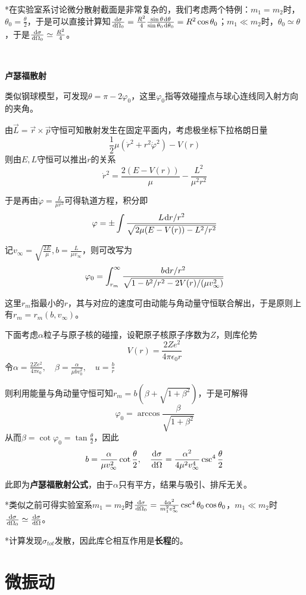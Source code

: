 \documentclass[a4paper,UTF8,fontset=windows]{ctexart}
\newcommand*{\dr}{\hspace{0.07em}\mathrm{d}}
\begin{document}
*在实验室系讨论微分散射截面是非常复杂的，我们考虑两个特例：$m_1=m_2$时，$\theta_0=\frac{\theta}{2}$，于是可以直接计算知$\frac{\dr\sigma}{\dr\Omega_0}=\frac{R^2}{4}\frac{\sin\theta\dr\theta}{\sin\theta_0\dr\theta_0}=R^2\cos\theta_0$；$m_1\ll m_2$时，$\theta_0\simeq\theta$，于是$\frac{\dr\sigma}{\dr\Omega_0}\simeq\frac{R^2}{4}$。

\

\textbf{卢瑟福散射}

类似钢球模型，可发现$\theta=\pi-2\varphi_0$，这里$\varphi_0$指等效碰撞点与球心连线同入射方向的夹角。

由$\vec{L}=\vec{r}\times\vec{p}$守恒可知散射发生在固定平面内，考虑极坐标下拉格朗日量
$$\frac{1}{2}\mu(\dot{r}^2+r^2\dot{\varphi}^2)-V(r)$$
则由$E,L$守恒可以推出$r$的关系
$$\dot{r}^2=\frac{2(E-V(r))}{\mu}-\frac{L^2}{\mu^2r^2}$$

于是再由$\dot{\varphi}=\frac{L}{\mu r^2}$可得轨道方程，积分即
$$\varphi=\pm\int\frac{L\dr r/r^2}{\sqrt{2\mu(E-V(r))-L^2/r^2}}$$

记$v_\infty=\sqrt{\frac{2E}{\mu}},b=\frac{L}{\mu v_{\infty}}$，则可改写为
$$\varphi_0=\int_{r_m}^\infty\frac{b\dr r/r^2}{\sqrt{1-b^2/r^2-2V(r)/(\mu v_\infty^2)}}$$

这里$r_m$指最小的$r$，其与对应的速度可由动能与角动量守恒联合解出，于是原则上有$r_m=r_m(b,v_\infty)$。

下面考虑$\alpha$粒子与原子核的碰撞，设靶原子核原子序数为$Z$，则库伦势
$$V(r)=\frac{2Ze^2}{4\pi\epsilon_0r}$$
令$\alpha=\frac{2Ze^2}{4\pi\epsilon_0},\quad\beta=\frac{\alpha}{\mu bv_0^2},\quad u=\frac{b}{r}$

则利用能量与角动量守恒可知$r_m=b(\beta+\sqrt{1+\beta^2})$，于是可解得
$$\varphi_0=\arccos\frac{\beta}{\sqrt{1+\beta^2}}$$
从而$\beta=\cot\varphi_0=\tan\frac{\theta}{2}$，因此$$b=\frac{\alpha}{\mu v_\infty^2}\cot\frac{\theta}{2},\quad\frac{\dr\sigma}{\dr\Omega}=\frac{\alpha^2}{4\mu^2v_\infty^4}\csc^4\frac{\theta}{2}$$

此即为\textbf{卢瑟福散射公式}，由于$\alpha$只有平方，结果与吸引、排斥无关。

*类似之前可得实验室系$m_1=m_2$时$\frac{\dr\sigma}{\dr\Omega_0}=\frac{4\alpha^2}{m_1^2v_\infty^2}\csc^4\theta_0\cos\theta_0$，$m_1\ll m_2$时$\frac{\dr\sigma}{\dr\Omega_0}\simeq\frac{\dr\sigma}{\dr\Omega}$。

*计算发现$\sigma_{tot}$发散，因此库仑相互作用是\textbf{长程}的。

\section{微振动}
\end{document}
